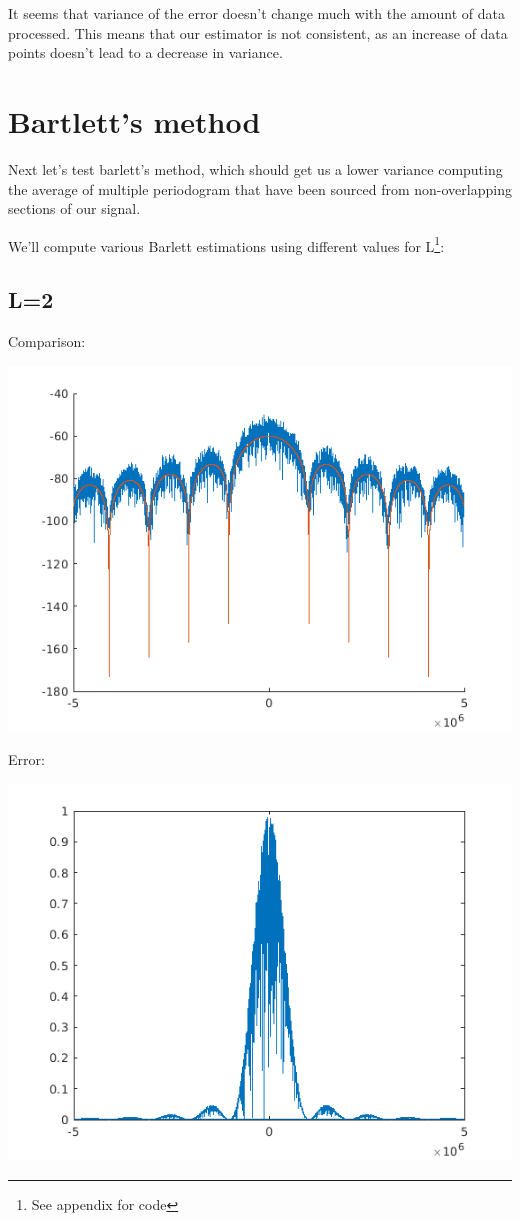 \documentclass[conference,9pt]{IEEEtran}
\begin{document}
It seems that variance of the error doesn't change much with the amount of data processed. This means that our estimator is not consistent, as an increase of data points doesn't lead to a decrease in variance.

\section{Bartlett's method}
Next let's test barlett's method, which should get us a lower variance computing the average of multiple periodogram that have been sourced from non-overlapping sections of our signal.

We'll compute various Barlett estimations using different values for L\footnote{See appendix for code}:

\subsection{L=2}
Comparison:

\includegraphics[scale=0.6]{barlett2.png}

Error:

\includegraphics[scale=0.6]{me2.png}
\end{document}
